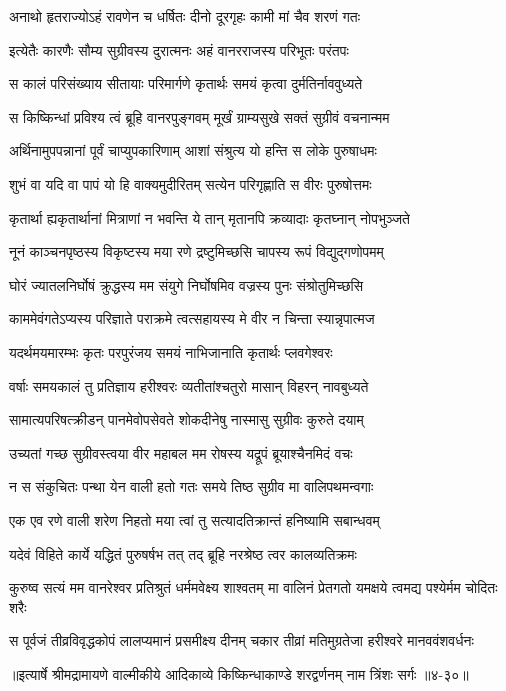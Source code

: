 \twolineshloka
{अनाथो हृतराज्योऽहं रावणेन च धर्षितः}
{दीनो दूरगृहः कामी मां चैव शरणं गतः} %

\twolineshloka
{इत्येतैः कारणैः सौम्य सुग्रीवस्य दुरात्मनः}
{अहं वानरराजस्य परिभूतः परंतपः} %

\twolineshloka
{स कालं परिसंख्याय सीतायाः परिमार्गणे}
{कृतार्थः समयं कृत्वा दुर्मतिर्नाववुध्यते} %

\twolineshloka
{स किष्किन्धां प्रविश्य त्वं ब्रूहि वानरपुङ्गवम्}
{मूर्खं ग्राम्यसुखे सक्तं सुग्रीवं वचनान्मम} %

\twolineshloka
{अर्थिनामुपपन्नानां पूर्वं चाप्युपकारिणाम्}
{आशां संश्रुत्य यो हन्ति स लोके पुरुषाधमः} %

\twolineshloka
{शुभं वा यदि वा पापं यो हि वाक्यमुदीरितम्}
{सत्येन परिगृह्णाति स वीरः पुरुषोत्तमः} %

\twolineshloka
{कृतार्था ह्यकृतार्थानां मित्राणां न भवन्ति ये}
{तान् मृतानपि क्रव्यादाः कृतघ्नान् नोपभुञ्जते} %

\twolineshloka
{नूनं काञ्चनपृष्ठस्य विकृष्टस्य मया रणे}
{द्रष्टुमिच्छसि चापस्य रूपं विद्युद्गणोपमम्} %

\twolineshloka
{घोरं ज्यातलनिर्घोषं क्रुद्धस्य मम संयुगे}
{निर्घोषमिव वज्रस्य पुनः संश्रोतुमिच्छसि} %

\twolineshloka
{काममेवंगतेऽप्यस्य परिज्ञाते पराक्रमे}
{त्वत्सहायस्य मे वीर न चिन्ता स्यान्नृपात्मज} %

\twolineshloka
{यदर्थमयमारम्भः कृतः परपुरंजय}
{समयं नाभिजानाति कृतार्थः प्लवगेश्वरः} %

\twolineshloka
{वर्षाः समयकालं तु प्रतिज्ञाय हरीश्वरः}
{व्यतीतांश्चतुरो मासान् विहरन् नावबुध्यते} %

\twolineshloka
{सामात्यपरिषत्क्रीडन् पानमेवोपसेवते}
{शोकदीनेषु नास्मासु सुग्रीवः कुरुते दयाम्} %

\twolineshloka
{उच्यतां गच्छ सुग्रीवस्त्वया वीर महाबल}
{मम रोषस्य यद्रूपं ब्रूयाश्चैनमिदं वचः} %

\twolineshloka
{न स संकुचितः पन्था येन वाली हतो गतः}
{समये तिष्ठ सुग्रीव मा वालिपथमन्वगाः} %

\twolineshloka
{एक एव रणे वाली शरेण निहतो मया}
{त्वां तु सत्यादतिक्रान्तं हनिष्यामि सबान्धवम्} %

\twolineshloka
{यदेवं विहिते कार्ये यद्धितं पुरुषर्षभ}
{तत् तद् ब्रूहि नरश्रेष्ठ त्वर कालव्यतिक्रमः} %

\twolineshloka
{कुरुष्व सत्यं मम वानरेश्वर प्रतिश्रुतं धर्ममवेक्ष्य शाश्वतम्}
{मा वालिनं प्रेतगतो यमक्षये त्वमद्य पश्येर्मम चोदितः शरैः} %

\twolineshloka
{स पूर्वजं तीव्रविवृद्धकोपं लालप्यमानं प्रसमीक्ष्य दीनम्}
{चकार तीव्रां मतिमुग्रतेजा हरीश्वरे मानववंशवर्धनः} %


॥इत्यार्षे श्रीमद्रामायणे वाल्मीकीये आदिकाव्ये किष्किन्धाकाण्डे शरद्वर्णनम् नाम त्रिंशः सर्गः ॥४-३०॥
